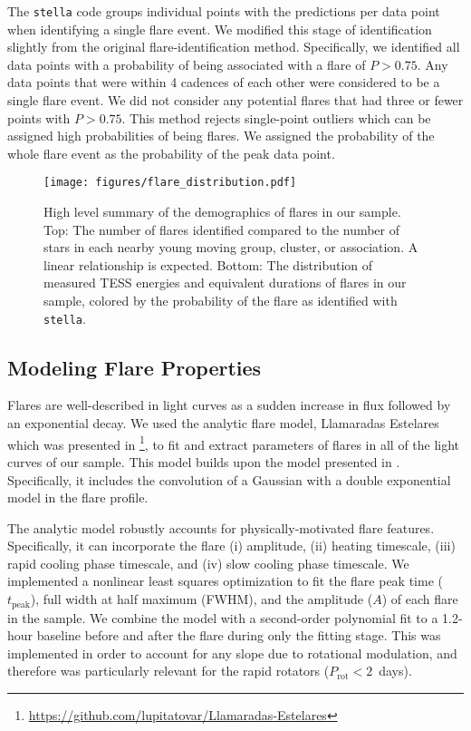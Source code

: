 \documentclass[twocolumn, linenumbers]{aastex631}
\begin{document}
The \texttt{stella} code groups individual points with the predictions per data point when identifying a single flare event. We modified this stage of identification slightly from the
original flare-identification method. Specifically, we identified all data points with a probability of being associated with a flare of $P > 0.75$. Any data points that were within 4
cadences of each other were considered to be a single flare event. We did not consider any potential flares that had three or fewer points with $P > 0.75$. This method rejects single-point
outliers which can be assigned  high probabilities of being  flares. We assigned the probability of the whole flare event as the probability of the peak data point.

\begin{figure}[ht!]
    \begin{centering}
        \texttt{[image: figures/flare\_distribution.pdf]}
        \caption{
            High level summary of the demographics of flares in our sample. Top: The number of flares identified compared to the number of stars in each nearby young moving group, cluster,
            or association. A linear relationship is expected. Bottom: The distribution of measured TESS energies
            and equivalent durations of flares in our sample, colored by the probability of the flare as identified with \texttt{stella}.
        }
        \label{fig:flare_distribution}
    \end{centering}
\end{figure}


\subsection{Modeling Flare Properties}\label{subsec2:model}

Flares are well-described in light curves as a sudden increase in flux followed by an exponential decay. We used the analytic flare model, Llamaradas Estelares which was presented in
\cite{tovar22}\footnote{\url{https://github.com/lupitatovar/Llamaradas-Estelares}}, to fit and extract parameters of flares in all of the light curves of our sample. This model builds
upon the model presented in \cite{davenport14}. Specifically, it includes the convolution of a Gaussian with a double exponential model in the flare profile.

The analytic model robustly  accounts for physically-motivated flare features. Specifically, it can incorporate the flare (i) amplitude, (ii) heating timescale, (iii) rapid cooling phase
timescale, and (iv) slow cooling phase timescale. We implemented a nonlinear least squares optimization to fit the flare peak time ($t_\textrm{peak}$), full width at half maximum (FWHM),
and the amplitude ($A$) of each flare in the sample.  We combine the model with a second-order polynomial fit to a 1.2-hour baseline before and after the flare  during only the fitting stage.
This was implemented in order to account for any slope due to rotational modulation, and therefore was particularly relevant for the rapid rotators ($P_\textrm{rot} < 2$~days).
\end{document}
